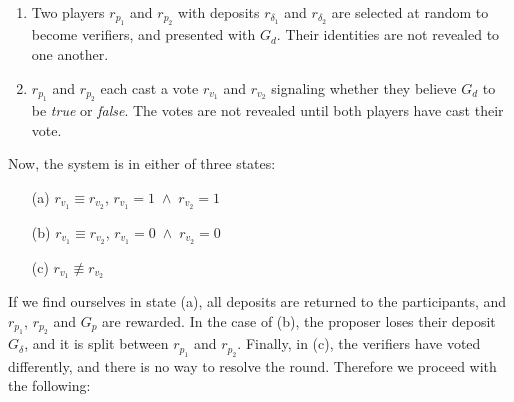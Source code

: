 \begin{enumerate}
    \item Two players $r_{p_1}$ and $r_{p_2}$ with deposits $r_{\delta_1}$ and
        $r_{\delta_2}$ are selected at random to become verifiers, and
        presented with $G_d$. Their identities are not revealed to one another.
    \item $r_{p_1}$ and $r_{p_2}$ each cast a vote $r_{v_1}$ and $r_{v_2}$
        signaling whether they believe $G_d$ to be \emph{true} or \emph{false}.
        The votes are not revealed until both players have cast their vote.
\end{enumerate}

Now, the system is in either of three states:

\begin{enumerate}
    \item[(a)] $r_{v_1} \equiv r_{v_2}$, \qquad $r_{v_1} = 1 \; \wedge \; r_{v_2} = 1$
    \item[(b)] $r_{v_1} \equiv r_{v_2}$, \qquad $r_{v_1} = 0 \; \wedge \; r_{v_2} = 0$
    \item[(c)] $r_{v_1} \not\equiv r_{v_2}$
\end{enumerate}

If we find ourselves in state (a), all deposits are returned to the
participants, and $r_{p_1}$, $r_{p_2}$ and $G_p$ are rewarded.  In the case of
(b), the proposer loses their deposit $G_{\delta}$, and it is split between
$r_{p_1}$ and $r_{p_2}$.  Finally, in (c), the verifiers have voted
differently, and there is no way to resolve the round.  Therefore we proceed
with the following:

